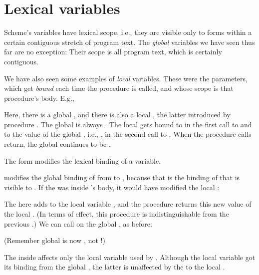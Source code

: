 \chapter{Lexical variables}

Scheme’s variables have lexical scope, i.e., they are
visible only to forms within a certain contiguous
stretch of program text.  The {\em global} variables we
have seen thus far are no exception: Their scope is all
program text, which is certainly contiguous.

We have also seen some examples of {\em local}
variables.  These were the  parameters, which
get {\em bound} each time the procedure is called, and
whose scope is that procedure’s body.  E.g.,


Here, there is a global , and there is also a
local , the latter introduced by procedure
.  The global  is always
.  The local  gets bound to  in the
first call to  and to the value of the global
, i.e., , in the second call to .
When the procedure calls return, the global 
continues to be .

The form  modifies the lexical binding of a
variable.


\n modifies the global binding of  from  to
, because that is the binding of  that is
visible to .  If the  was inside
’s body, it would have modified the local
:


The  here adds  to the local variable
, and the procedure returns this new value of the local .  (In terms of effect,
this procedure is indistinguishable from the previous
.)  We can call  on the
global , as before:


\n (Remember global  is now , not !)

The  inside  affects only the local
variable used by .  Although the local variable
 got its  binding from the global ,
the latter is unaffected by the  to the local
.

